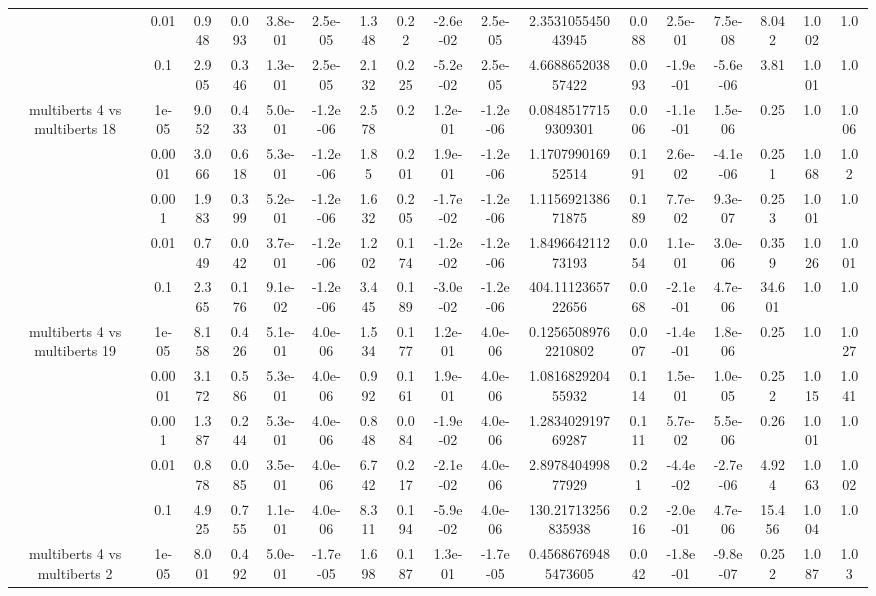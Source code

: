 \begin{tabular}{|c|c|c|c|c|c|c|c|c|c|c|c|c|c|c|c|c|}
 & 0.01 & 0.948 & 0.093 & 3.8e-01 & 2.5e-05 & 1.348 & 0.22 & -2.6e-02 & 2.5e-05 & 2.353105545043945 & 0.088 & 2.5e-01 & 7.5e-08 & 8.042 & 1.002 & 1.0 \\
 & 0.1 & 2.905 & 0.346 & 1.3e-01 & 2.5e-05 & 2.132 & 0.225 & -5.2e-02 & 2.5e-05 & 4.668865203857422 & 0.093 & -1.9e-01 & -5.6e-06 & 3.81 & 1.001 & 1.0 \\
\hline
\multirow{5}{*}{multiberts 4 vs multiberts 18} & 1e-05 & 9.052 & 0.433 & 5.0e-01 & -1.2e-06 & 2.578 & 0.2 & 1.2e-01 & -1.2e-06 & 0.08485177159309301 & 0.006 & -1.1e-01 & 1.5e-06 & 0.25 & 1.0 & 1.006 \\
 & 0.0001 & 3.066 & 0.618 & 5.3e-01 & -1.2e-06 & 1.85 & 0.201 & 1.9e-01 & -1.2e-06 & 1.170799016952514 & 0.191 & 2.6e-02 & -4.1e-06 & 0.251 & 1.068 & 1.02 \\
 & 0.001 & 1.983 & 0.399 & 5.2e-01 & -1.2e-06 & 1.632 & 0.205 & -1.7e-02 & -1.2e-06 & 1.115692138671875 & 0.189 & 7.7e-02 & 9.3e-07 & 0.253 & 1.001 & 1.0 \\
 & 0.01 & 0.749 & 0.042 & 3.7e-01 & -1.2e-06 & 1.202 & 0.174 & -1.2e-02 & -1.2e-06 & 1.849664211273193 & 0.054 & 1.1e-01 & 3.0e-06 & 0.359 & 1.026 & 1.001 \\
 & 0.1 & 2.365 & 0.176 & 9.1e-02 & -1.2e-06 & 3.445 & 0.189 & -3.0e-02 & -1.2e-06 & 404.1112365722656 & 0.068 & -2.1e-01 & 4.7e-06 & 34.601 & 1.0 & 1.0 \\
\hline
\multirow{5}{*}{multiberts 4 vs multiberts 19} & 1e-05 & 8.158 & 0.426 & 5.1e-01 & 4.0e-06 & 1.534 & 0.177 & 1.2e-01 & 4.0e-06 & 0.12565089762210802 & 0.007 & -1.4e-01 & 1.8e-06 & 0.25 & 1.0 & 1.027 \\
 & 0.0001 & 3.172 & 0.586 & 5.3e-01 & 4.0e-06 & 0.992 & 0.161 & 1.9e-01 & 4.0e-06 & 1.081682920455932 & 0.114 & 1.5e-01 & 1.0e-05 & 0.252 & 1.015 & 1.041 \\
 & 0.001 & 1.387 & 0.244 & 5.3e-01 & 4.0e-06 & 0.848 & 0.084 & -1.9e-02 & 4.0e-06 & 1.283402919769287 & 0.111 & 5.7e-02 & 5.5e-06 & 0.26 & 1.001 & 1.0 \\
 & 0.01 & 0.878 & 0.085 & 3.5e-01 & 4.0e-06 & 6.742 & 0.217 & -2.1e-02 & 4.0e-06 & 2.897840499877929 & 0.21 & -4.4e-02 & -2.7e-06 & 4.924 & 1.063 & 1.002 \\
 & 0.1 & 4.925 & 0.755 & 1.1e-01 & 4.0e-06 & 8.311 & 0.194 & -5.9e-02 & 4.0e-06 & 130.21713256835938 & 0.216 & -2.0e-01 & 4.7e-06 & 15.456 & 1.004 & 1.0 \\
\hline
\multirow{5}{*}{multiberts 4 vs multiberts 2} & 1e-05 & 8.001 & 0.492 & 5.0e-01 & -1.7e-05 & 1.698 & 0.187 & 1.3e-01 & -1.7e-05 & 0.45686769485473605 & 0.042 & -1.8e-01 & -9.8e-07 & 0.252 & 1.087 & 1.03 \\

\end{tabular}

